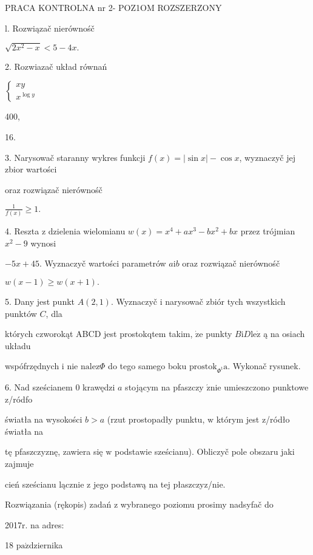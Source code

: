 \documentclass[a4paper,12pt]{article}
\begin{document}
PRACA KONTROLNA nr 2- POZ1OM ROZSZERZONY

l. Rozwiązač nierównośč

$\sqrt{2x^{2}-x}<5-4x.$

2. Rozwiazač układ równań

$\left\{\begin{array}{l}
xy\\
x^{\log y}
\end{array}\right.$

400,

16.

3. Narysowač staranny wykres funkcji $f(x)=|\sin x|-\cos x$, wyznaczyč jej zbior wartości

oraz rozwiązač nierównośč

$\displaystyle \frac{1}{f(x)}\geq 1.$

4. Reszta $\mathrm{z}$ dzielenia wielomianu $w(x)=x^{4}+ax^{3}-bx^{2}+bx$ przez trójmian $x^{2}-9$ wynosi

$-5x+45$. Wyznaczyč wartości parametrów $a\mathrm{i}b$ oraz rozwiązač nierównośč

$w(x-1)\geq w(x+1).$

5. Dany jest punkt $A(2,1)$. Wyznaczyč $\mathrm{i}$ narysowač zbiór tych wszystkich punktów $C$, dla

których czworokąt ABCD jest prostokqtem takim, $\dot{\mathrm{z}}\mathrm{e}$ punkty $B\mathrm{i}D\mathrm{l}\mathrm{e}\dot{\mathrm{z}}$ ą na osiach układu

wspófrzędnych $\mathrm{i}$ nie $\mathrm{n}\mathrm{a}\mathrm{l}\mathrm{e}\mathrm{z}\Phi$ do tego samego boku $\mathrm{p}\mathrm{r}\mathrm{o}\mathrm{s}\mathrm{t}\mathrm{o}\mathrm{k}_{\Phi^{\mathrm{t}}}\mathrm{a}$. Wykonač rysunek.

6. Nad sześcianem $0$ krawędzi $a$ stojącym na pfaszczy $\acute{\mathrm{z}}\mathrm{n}\mathrm{i}\mathrm{e}$ umieszczono punktowe z/ródfo

światła na wysokości $b>a$ (rzut prostopadły punktu, $\mathrm{w}$ którym jest z/ródło światła na

tę pfaszczyznę, zawiera się $\mathrm{w}$ podstawie sześcianu). Obliczyč pole obszaru jaki zajmuje

cień sześcianu lącznie $\mathrm{z}$ jego podstawą na tej płaszczyz/nie.

Rozwiązania (rękopis) zadań z wybranego poziomu prosimy nadsyfač do

2017r. na adres:

18 $\mathrm{p}\mathrm{a}\acute{\mathrm{z}}$dziernika
\end{document}
